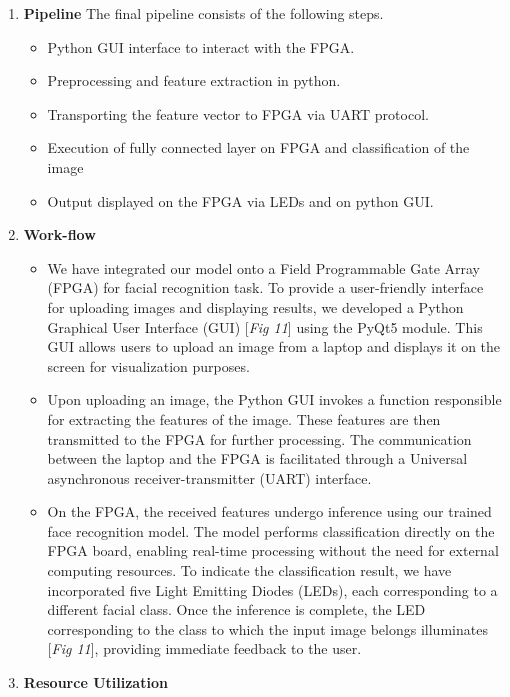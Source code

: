 \documentclass{article}
\begin{document}
\begin{enumerate}
\item \textbf{Pipeline}
The final pipeline consists of the following steps.
\begin{itemize}
    \item Python GUI interface to interact with the FPGA.
    \item Preprocessing and feature extraction in python.
    \item Transporting the feature vector to FPGA via UART protocol.
    \item Execution of fully connected layer on FPGA and classification of the image
    \item Output displayed on the FPGA via LEDs and on python GUI.
\end{itemize}
\newpage

\item \textbf{Work-flow}
\begin{itemize}
\item We have integrated our model onto a Field Programmable Gate Array (FPGA) for facial recognition task. To provide a user-friendly interface for uploading images and displaying results, we developed a Python Graphical User Interface (GUI) [\textit{Fig 11}] using the PyQt5 module. This GUI allows users to upload an image from a laptop and displays it on the screen for visualization purposes.

\item Upon uploading an image, the Python GUI invokes a function responsible for extracting the features of the image. These features are then transmitted to the FPGA for further processing. The communication between the laptop and the FPGA is facilitated through a Universal asynchronous receiver-transmitter (UART) interface.

\item On the FPGA, the received features undergo inference using our trained face recognition model. The model performs classification directly on the FPGA board, enabling real-time processing without the need for external computing resources. To indicate the classification result, we have incorporated five Light Emitting Diodes (LEDs), each corresponding to a different facial class. Once the inference is complete, the LED corresponding to the class to which the input image belongs illuminates [\textit{Fig 11}], providing immediate feedback to the user.
\end{itemize}

\item \textbf{Resource Utilization}


\end{enumerate}
\end{document}
